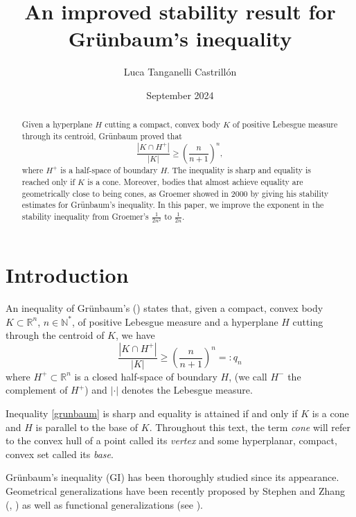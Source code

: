 \documentclass[12pt,reqno]{amsart}
\title{An improved stability result for Grünbaum's inequality}
\author{Luca Tanganelli Castrillón}
\date{September 2024}
\newcommand{\R}{\mathbb{R}}
\theoremstyle{plain}
\theoremstyle{definition}
\theoremstyle{remark}
\numberwithin{equation}{section}
\begin{document}
\begin{abstract}
    Given a hyperplane $H$ cutting a compact, convex body $K$ of positive Lebesgue measure through its centroid, Grünbaum proved that
    $$\frac{|K\cap H^+|}{|K|}\geq \left(\frac{n}{n+1}\right)^n,$$where $H^+$ is a half-space of boundary $H$. The inequality is sharp and equality is reached only if $K$ is a cone. Moreover, bodies that almost achieve equality are geometrically close to being cones, as Groemer showed in 2000 by giving his stability estimates for Grünbaum's inequality. In this paper, we improve the exponent in the stability inequality from Groemer's $\frac{1}{2n^2}$ to $\frac{1}{2n}$.
\end{abstract}

\maketitle



\section{Introduction}

An inequality of Grünbaum's (\cite{Gru1}) states that, given a compact, convex body $K\subset\R^n$, $n\in \mathbb{N}^*$, of positive Lebesgue measure and a hyperplane $H$ cutting through the centroid of $K$, we have
\begin{equation}\label{grunbaum}
    \frac{|K\cap H^+|}{|K|}\geq \left(\frac n{n+1}\right)^n=:q_n
\end{equation}
where $H^+\subset \R^n$ is a closed half-space of boundary $H$, (we call $H^-$ the complement of $H^+$) and $|\cdot|$ denotes the Lebesgue measure.

Inequality \eqref{grunbaum} is sharp and equality is attained if and only if $K$ is a cone and $H$ is parallel to the base of $K$. Throughout this text, the term \textit{cone} will refer to the convex hull of a point called its \textit{vertex} and some hyperplanar, compact, convex set called its \textit{base}.

Grünbaum's inequality (GI) has been thoroughly studied since its appearance. Geometrical generalizations have been recently proposed by Stephen and Zhang (\cite{KK}, \cite{JJ}) as well as functional generalizations (see \cite{FF}).
\end{document}
